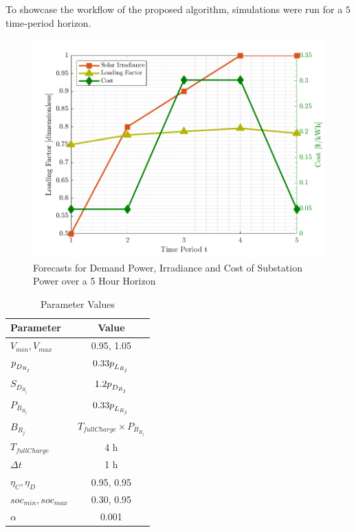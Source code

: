 \documentclass[../../outputs/main.tex]{subfiles}
\begin{document}
To showcase the workflow of the proposed algorithm, simulations were run for a $5$ time-period horizon. 

\begin{figure}[h!]
    \centering
    \includegraphics[height=0.25\textheight]{../figures/T5-inputCurves/InputCurves_Horizon_5.png}
    \caption{Forecasts for Demand Power, Irradiance and Cost of Substation Power over a 5 Hour Horizon}
    \label{fig:inputCurve-5}
\end{figure}

\def\ds{\rule{0pt}{1.5ex}} %

\begin{table}[h!]
    \centering
    \caption{Parameter Values}
    \begin{tabular}{|l|c|}
    \hline
    \textbf{Parameter} & \textbf{Value} \\ \hline
    $V_{min}, V_{max}$ & 0.95, 1.05 \\ \hline
    $p_{\ds D_{R_j}}$ & $0.33 p_{\ds L_{R_j}}$ \\ \hline
    $S_{D_{R_j}}$ & $1.2 p_{\ds D_{R_j}}$ \\ \hline
    $P_{B_{R_j}}$ & $0.33 p_{\ds L_{R_j}}$ \\ \hline
    $B_{R_j}$ & $T_{fullCharge} \times P_{B_{R_j}}$ \\ \hline
    $T_{fullCharge}$ & 4 h \\ \hline
    $\Delta t$ & 1 h \\ \hline
    $\eta_C, \eta_D$ & 0.95, 0.95 \\ \hline
    $soc_{min}, soc_{max}$ & 0.30, 0.95 \\ \hline
    $\alpha$ & 0.001 \\ \hline
    \end{tabular}
    \label{table:parameter-values}
\end{table}
\end{document}
